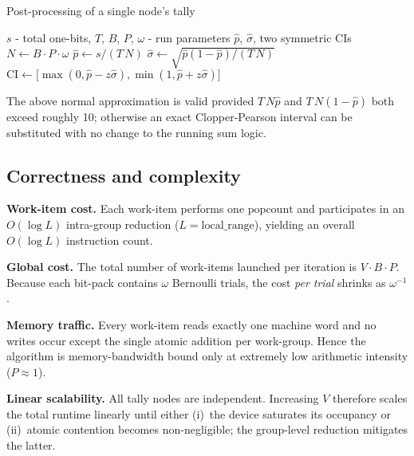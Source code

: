 \begin{algorithm}[H]
\caption{Post-processing of a single node’s tally}
\label{alg:update_stats}
\begin{algorithmic}[1]
  \Require
    \(s\) - total one-bits,
    \(T\), \(B\), \(P\), \(\omega\) - run parameters
  \Ensure
    \(\widehat{p}\), \(\widehat{\sigma}\), two symmetric CIs
  \State $N\gets B\cdot P\cdot\omega$
  \State $\widehat{p}\gets s / (T\,N)$
  \State $\widehat{\sigma}\gets
          \sqrt{\widehat{p}(1-\widehat{p})/(T\,N)}$
      \State $\text{CI}\gets
        \bigl[\max(0,\widehat{p}-z\widehat{\sigma}),
              \min(1,\widehat{p}+z\widehat{\sigma})\bigr]$
  \EndFor
\end{algorithmic}
\end{algorithm}

The above normal approximation is valid provided \(T\,N\widehat{p}\)
and \(T\,N(1-\widehat{p})\) both exceed roughly 10; otherwise an exact
Clopper-Pearson interval can be substituted with no change to the running
sum logic.

\subsection{Correctness and complexity}

\textbf{Work-item cost.}
Each work-item performs one \(\mathrm{popcount}\) and
participates in an \(O(\log L)\) intra-group reduction
(\(L\!=\!\text{local\_range}\)), yielding an overall
\(O(\log L)\) instruction count.

\textbf{Global cost.}
The total number of work-items launched per iteration is
\(V\cdot B\cdot P\).  Because each bit-pack contains \(\omega\) Bernoulli
trials, the cost \emph{per trial} shrinks as \(\omega^{-1}\).

\textbf{Memory traffic.}
Every work-item reads exactly one machine word and no writes occur except
the single atomic addition per work-group.  Hence the algorithm is
memory-bandwidth bound only at extremely low arithmetic intensity
(\(P\approx 1\)).

\textbf{Linear scalability.}
All tally nodes are independent.  Increasing \(V\) therefore scales the total
runtime linearly until either (i)~the device saturates its occupancy or
(ii)~atomic contention becomes non-negligible; the group-level reduction
mitigates the latter.